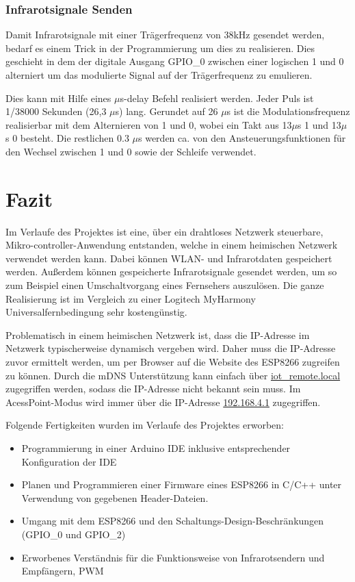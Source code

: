\subsubsection{Infrarotsignale Senden}
Damit Infrarotsignale mit einer Trägerfrequenz von 38kHz gesendet werden, bedarf es einem Trick in der Programmierung um dies zu realisieren.
Dies geschieht in dem der digitale Ausgang \acs{GPIO}\_0 zwischen einer logischen 1 und 0 alterniert um das modulierte Signal auf der Trägerfrequenz zu emulieren.

Dies kann mit Hilfe eines $\mu$s-delay Befehl realisiert werden.
Jeder Puls ist 1/38000 Sekunden (26,3 $\mu$s) lang. 
Gerundet auf 26 $\mu$s ist die Modulationsfrequenz realisierbar mit dem Alternieren von 1 und 0, wobei ein Takt aus 13$\mu$s 1 und 13$\mu$s 0 besteht.
Die restlichen 0.3 $\mu$s werden ca. von den Ansteuerungsfunktionen für den Wechsel zwischen 1 und 0 sowie der Schleife verwendet.

\section{Fazit}

Im Verlaufe des Projektes ist eine, über ein drahtloses Netzwerk steuerbare, Mikro-controller-Anwendung entstanden, welche in einem heimischen Netzwerk verwendet werden kann.
Dabei können WLAN- und Infrarotdaten gespeichert werden.
Außerdem können gespeicherte Infrarotsignale gesendet werden, um so zum Beispiel einen Umschaltvorgang eines Fernsehers auszulösen.
Die ganze Realisierung ist im Vergleich zu einer Logitech MyHarmony Universalfernbedingung sehr kostengünstig.

Problematisch in einem heimischen Netzwerk ist, dass die IP-Adresse im Netzwerk typischerweise dynamisch vergeben wird.
Daher muss die IP-Adresse zuvor ermittelt werden, um per Browser auf die Website des ESP8266 zugreifen zu können.
Durch die mDNS Unterstützung kann einfach über \url{iot_remote.local} zugegriffen werden, sodass die IP-Adresse nicht bekannt sein muss.
Im AcessPoint-Modus wird immer über die IP-Adresse \url{192.168.4.1} zugegriffen.

Folgende Fertigkeiten wurden im Verlaufe des Projektes erworben:
\begin{itemize}
	\item Programmierung in einer Arduino \acs{IDE} inklusive entsprechender Konfiguration der \acs{IDE}
	\item Planen und Programmieren einer Firmware eines ESP8266 in C/C++ unter Verwendung von gegebenen Header-Dateien.
	\item Umgang mit dem ESP8266 und den Schaltungs-Design-Beschränkungen (GPIO\_0 und GPIO\_2)
	\item Erworbenes Verständnis für die Funktionsweise von Infrarotsendern und Empfängern, \acs{PWM}
\end{itemize} 

